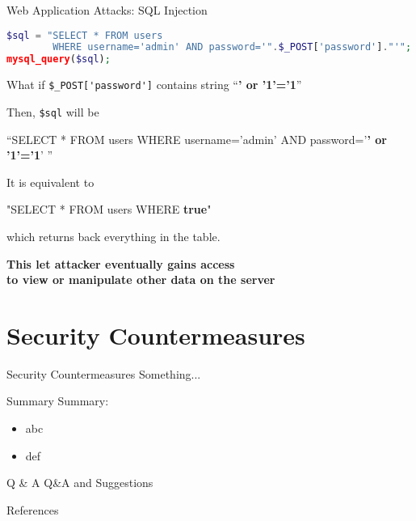 \documentclass[12pt]{beamer}
\begin{document}
\begin{frame}[fragile]{Web Application Attacks: SQL Injection}
    \footnotesize
\begin{lstlisting}[language=php]
$sql = "SELECT * FROM users 
        WHERE username='admin' AND password='".$_POST['password']."'";
mysql_query($sql);
\end{lstlisting}

    What if \lstinline|$_POST['password']| contains string ``\textbf{\color{red}' or '1'='1}''
    
    \medskip Then, \lstinline|$sql| will be
    
    ``SELECT * FROM users WHERE username='admin' AND password='\textbf{\color{red}' or '1'='1}' ''
    
    \medskip It is equivalent to
    
    "SELECT * FROM users WHERE \textbf{\color{red} true}"
    
    which returns back everything in the table.
    
    \medskip \begin{center}
        \normalsize
        \textbf{This let attacker eventually gains access\\
            to view or manipulate other data on the server}
    \end{center}
\end{frame}

\section{Security Countermeasures}
\begin{frame}{Security Countermeasures}
    Something...
    
    \bigskip
\end{frame}


\begin{frame}{Summary}
    Summary:
    \begin{itemize}
        \item abc
        \item def
    \end{itemize}
\end{frame}

\begin{frame}{Q \& A}
    \centering\large
    Q\&A and Suggestions
\end{frame}

\begin{frame}{References}
    \begin{block}{}
        \printbibliography[heading=none]
    \end{block}
\end{frame}
\end{document}
